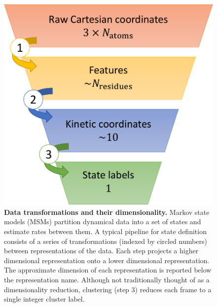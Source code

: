 \begin{figure}[htbp]
\centering
\includegraphics[width=0.9\linewidth]{1-src/dimreduce}
\caption{\textbf{Data transformations and their dimensionality.}
    Markov state models (MSMs) partition dynamical data into a set of
    states and estimate rates between them. A typical pipeline for state
    definition consists of a series of transformations (indexed by circled numbers)
    between representations of the data. Each step projects a higher
    dimensional representation onto a lower dimensional representation. The
    approximate dimension of each representation is reported below the
    representation name.
    Although not traditionally thought of as a 
    dimensionality reduction, clustering (step 3) 
    reduces each frame to a single integer cluster label.
}
\label{fig:dimreduce}
\end{figure}

